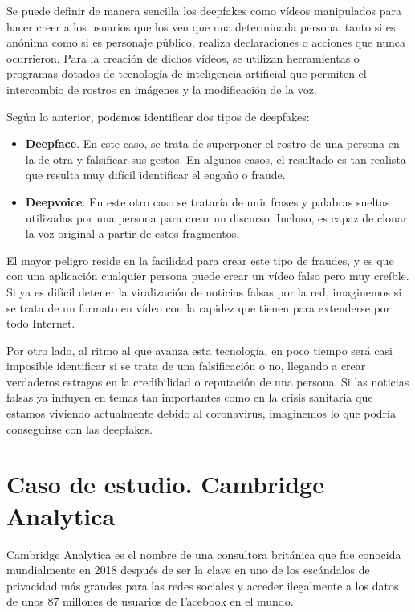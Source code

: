 Se puede definir de manera sencilla los deepfakes como vídeos manipulados para hacer creer a los usuarios que los ven que una determinada persona, tanto si es anónima como si es personaje público, realiza declaraciones o acciones que nunca ocurrieron. Para la creación de dichos vídeos, se utilizan herramientas o programas dotados de tecnología de inteligencia artificial que permiten el intercambio de rostros en imágenes y la modificación de la voz.

Según lo anterior, podemos identificar dos tipos de deepfakes:
\begin{itemize}
    \item \textbf{Deepface}. En este caso, se trata de superponer el rostro de una persona en la de otra y falsificar sus gestos. En algunos casos, el resultado es tan realista que resulta muy difícil identificar el engaño o fraude.
    \item \textbf{Deepvoice}. En este otro caso se trataría de unir frases y palabras sueltas utilizadas por una persona para crear un discurso. Incluso, es capaz de clonar la voz original a partir de estos fragmentos.
\end{itemize}

El mayor peligro reside en la facilidad para crear este tipo de fraudes, y es que con una aplicación cualquier persona puede crear un vídeo falso pero muy creíble. Si ya es difícil detener la viralización de noticias falsas por la red, imaginemos si se trata de un formato en vídeo con la rapidez que tienen para extenderse por todo Internet.

Por otro lado, al ritmo al que avanza esta tecnología, en poco tiempo será casi imposible identificar si se trata de una falsificación o no, llegando a crear verdaderos estragos en la credibilidad o reputación de una persona. Si las noticias falsas ya influyen en temas tan importantes como en la crisis sanitaria que estamos viviendo actualmente debido al coronavirus, imaginemos lo que podría conseguirse con las deepfakes.

\section{Caso de estudio. Cambridge Analytica}

Cambridge Analytica es el nombre de una consultora británica que fue conocida mundialmente en 2018 después de ser la clave en uno de los escándalos de privacidad más grandes para las redes sociales y acceder ilegalmente a los datos de unos 87 millones de usuarios de Facebook en el mundo. 

